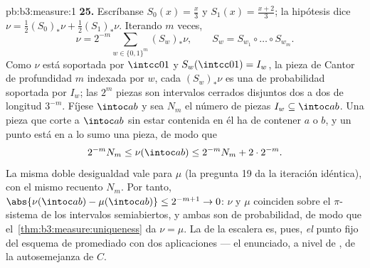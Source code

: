 \begin{solution}{pb:b3:measure:1}
\textbf{25.} Escríbanse $S_0(x) = \frac x3$ y $S_1(x) =
\frac{x+2}3$; la hipótesis dice $\nu = \frac12(S_0)_*\nu +
\frac12(S_1)_*\nu$. Iterando $m$ veces,
\[
\nu = 2^{-m}\sum_{w \in \{0,1\}^m}(S_w)_*\nu,
\qquad S_w = S_{w_1}\circ\dots\circ S_{w_m}.
\]
Como $\nu$ está soportada por $\intcc01$ y $S_w(\intcc01) =
I_w$, la pieza de Cantor de profundidad $m$ indexada por $w$, cada
$(S_w)_*\nu$ es una  de
probabilidad soportada por $I_w$; las $2^m$ piezas son intervalos
cerrados disjuntos dos a dos de longitud $3^{-m}$. Fíjese $\intoc ab$ y
sea $N_m$ el número de piezas $I_w \subseteq \intoc ab$. Una pieza que
corte a $\intoc ab$ sin estar contenida en él ha de contener $a$ o $b$,
y un punto está en a lo sumo una pieza, de modo que
\[
2^{-m}N_m \leq \nu(\intoc ab) \leq 2^{-m}N_m + 2\cdot2^{-m}.
\]
La misma doble desigualdad vale para $\mu$ (la pregunta 19 da la
iteración idéntica), con el mismo recuento $N_m$. Por tanto,
$\abs{\nu(\intoc ab) - \mu(\intoc ab)} \leq 2^{-m+1} \to 0$:
$\nu$ y $\mu$ coinciden sobre el $\pi$-sistema de los intervalos
semiabiertos, y ambas son  de
probabilidad, de modo que el~\cref{thm:b3:measure:uniqueness} da
$\nu = \mu$. La  de la escalera
es, pues, \emph{el} punto fijo del esquema de promediado con dos
aplicaciones --- el enunciado, a nivel de , de la autosemejanza
de $C$.
\end{solution}
